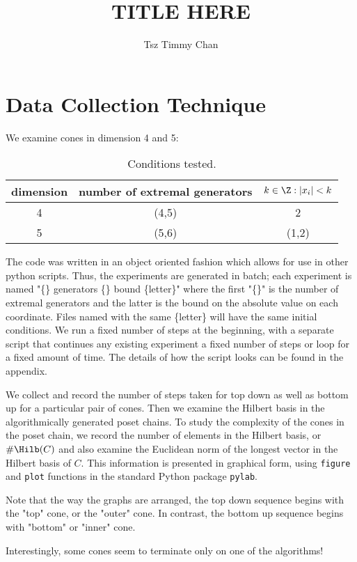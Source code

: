 \documentclass{TC}
\title{TITLE HERE}	%
\author{Tsz Timmy Chan}	%
\begin{document}
\section{Data Collection Technique}
We examine cones in dimension 4 and 5:
\begin{table}[h]
\centering
\begin{tabular}{c | c| c}
dimension & number of extremal generators & $k \in \Z: |x_i|< k$ \\ \hline
4 & (4,5) & 2 \\
5 & (5,6) & (1,2)
\end{tabular}
\caption{Conditions tested.}
\end{table}


The code was written in an object oriented fashion which allows for use in other python scripts. Thus, the experiments are generated in batch; each experiment is named "\{\} generators \{\} bound \{letter\}" where the first "\{\}" is the number of extremal generators and the latter is the bound on the absolute value on each coordinate. Files named with the same \{letter\} will have the same initial conditions. We run a fixed number of steps at the beginning, with a separate script that continues any existing experiment a fixed number of steps or loop for a fixed amount of time. The details of how the script looks can be found in the appendix.

We collect and record the number of steps taken for top down as well as bottom up for a particular pair of cones. Then we examine the Hilbert basis in the algorithmically generated poset chains. To study the complexity of the cones in the poset chain, we record the number of elements in the Hilbert basis, or $\#\Hilb(C)$ and also examine the Euclidean norm of the longest vector in the Hilbert basis of $C$. This information is presented in graphical form, using \texttt{figure} and \texttt{plot} functions in the standard Python package \texttt{pylab}.

Note that the way the graphs are arranged, the top down sequence begins with the "top" cone, or the "outer" cone. In contrast, the bottom up sequence begins with "bottom" or "inner" cone. 

Interestingly, some cones seem to terminate only on one of the algorithms!



\newpage
\end{document}
